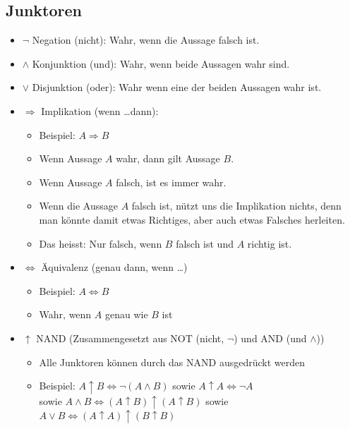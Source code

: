 \subsection{Junktoren}
\begin{itemize}
  \item $\neg$ Negation (nicht): Wahr, wenn die Aussage falsch ist.
  \item $\wedge$ Konjunktion (und): Wahr, wenn beide Aussagen wahr sind.
  \item $\vee$ Disjunktion (oder): Wahr wenn eine der beiden Aussagen wahr ist.
  \item $\Rightarrow$ Implikation (wenn \dots dann):
    \begin{itemize}
      \item Beispiel: $A \Rightarrow B$
      \item Wenn Aussage $A$ wahr, dann gilt Aussage $B$.
      \item Wenn Aussage $A$ falsch, ist es immer wahr.
      \item Wenn die Aussage $A$ falsch ist, nützt uns die Implikation nichts,
        denn man könnte damit etwas Richtiges, aber auch etwas Falsches herleiten.
      \item Das heisst: Nur falsch, wenn $B$ falsch ist und $A$ richtig ist.
    \end{itemize}
  \item $\Leftrightarrow$ Äquivalenz (genau dann, wenn \dots)
    \begin{itemize}
      \item Beispiel: $A \Leftrightarrow B$
      \item Wahr, wenn $A$ genau wie $B$ ist
    \end{itemize}
  \item $\uparrow$ NAND (Zusammengesetzt aus NOT (nicht, $\neg$) und AND (und $\wedge$))
    \begin{itemize}
      \item Alle Junktoren können durch das NAND ausgedrückt werden
      \item Beispiel: $A \uparrow B \Leftrightarrow \neg (A \wedge B)$ sowie $A \uparrow A \Leftrightarrow \neg A$ \\
       sowie $A \wedge B \Leftrightarrow (A \uparrow B) \uparrow (A \uparrow B)$ sowie 
         $A \vee B \Leftrightarrow (A \uparrow A) \uparrow (B \uparrow B)$
    \end{itemize}
\end{itemize}


